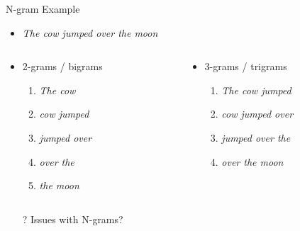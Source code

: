 \documentclass[aspectratio=169]{beamer}
\begin{document}
\begin{frame}{N-gram Example}

\begin{itemize}
\item \textit{The cow jumped over the moon}
\end{itemize}
\begin{columns}[t]
\begin{column}{0.5\textwidth}
\begin{itemize}
\item 2-grams / bigrams
\begin{enumerate}
\item \textit{The cow}
\item \textit{cow jumped}
\item  \textit{jumped over}
\item \textit{over the}
\item \textit{the moon}
\end{enumerate}
\end{itemize}
\end{column}
\begin{column}{0.5\textwidth}
\begin{itemize}
\item 3-grams / trigrams
\begin{enumerate}
\item  \textit{The cow jumped}
\item \textit{cow jumped over}
\item \textit{jumped over the}
\item \textit{over the moon}
\end{enumerate}
\end{itemize}
\end{column}
\end{columns}
\begin{itemize}
\item[?] Issues with N-grams?
\end{itemize}
\end{frame}
\end{document}
